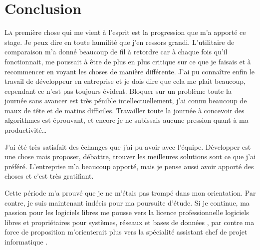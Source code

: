 \chapter{Conclusion} %
\label{cha:Conclusion}

\lettrine{L}{a} première chose qui me vient à l'esprit est la
progression que m'a apporté ce stage. Je peux dire en toute humilité que
j'en ressors grandi.  L'utilitaire de comparaison m'a donné beaucoup de
fil à retordre car à chaque fois qu'il fonctionnait,  me
poussait à être de plus en plus critique sur ce que je faisais et à
recommencer en voyant les choses de manière différente.  J'ai pu
connaître enfin le travail de développeur en entreprise et je dois dire
que cela me plait beaucoup, cependant ce n'est pas toujours évident.
Bloquer sur un problème toute la journée sans avancer est très pénible
intellectuellement, j'ai connu beaucoup de maux de tête et de matins
difficiles. Travailler toute la journée à concevoir des algorithmes est
éprouvant, et encore je ne subissais aucune pression quant à ma
productivité\dots

J'ai été très satisfait des échanges que j'ai pu avoir avec l'équipe.
Développer est une chose mais proposer, débattre, trouver les meilleures
solutions sont ce que j'ai préféré. L'entreprise m'a beaucoup apporté,
mais je pense aussi avoir apporté des choses et c'est très gratifiant.

Cette période m'a prouvé que je ne m'étais pas trompé dans mon
orientation. Par contre, je suis maintenant indécis pour ma poursuite
d'étude. Si je continue, ma passion pour les logiciels libres me pousse
vers la licence professionnelle \og logiciels libres et propriétaires
pour systèmes, réseaux et bases de données \fg{}, par contre ma force de
proposition m'orienterait plus vers la \og spécialité assistant chef de
projet informatique \fg{}.
